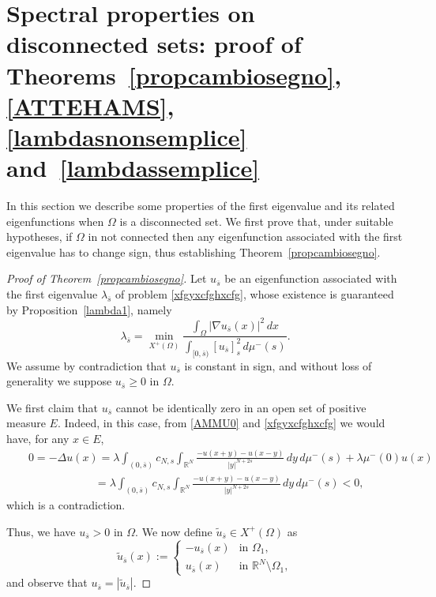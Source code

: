\documentclass[12pt,a4paper,intlimits,sumlimits]{amsart}
\def \R {\mathbb{R}}
\theoremstyle{definition}
\theoremstyle{plain}
\numberwithin{equation}{section}
\renewcommand{\geq}{\geqslant}
\begin{document}
\section{Spectral properties on disconnected sets:
proof of Theorems~\ref{propcambiosegno}, \ref{ATTEHAMS},
\ref{lambdasnonsemplice}
and~\ref{lambdassemplice}}\label{sezionedisconnessi}

In this section we describe some properties of the first eigenvalue and its related eigenfunctions when $\Omega$ is a disconnected set.
We first prove that, under suitable hypotheses, if $\Omega$ in not connected then any eigenfunction associated with the first eigenvalue has to change sign,
thus establishing Theorem~\ref{propcambiosegno}.

\begin{proof}[Proof of Theorem~\ref{propcambiosegno}]
Let $u_{\overline s}$ be an eigenfunction associated with the first eigenvalue $\lambda_{\overline s}$ of problem \eqref{xfgyxcfghxcfg}, whose existence is guaranteed by Proposition~\ref{lambda1},
namely
\begin{equation}\label{xfgyxcfghxcfg1}
\lambda_{\overline s}=\min_{X^+(\Omega)} \dfrac{\displaystyle\int_{\Omega}|\nabla u_{\overline s}(x)|^2\,dx}{\displaystyle \int_{[0,\overline s)}[u_{\overline s}]_s^2\,d\mu^-(s)}.
\end{equation}
We assume by contradiction that $u_{\overline s}$ is constant in sign, and without loss of generality we suppose $u_{\overline s}\geq 0$ in $\Omega$. 

We first claim that $u_{\overline s}$ cannot be identically zero in an open set of positive measure $E$. Indeed, in this case, from \eqref{AMMU0} and \eqref{xfgyxcfghxcfg} we would have, for any $x\in E$,
\begin{eqnarray*}&&
0=-\Delta u(x)= \lambda\displaystyle \int_{(0,\overline s)} c_{N,s}\int_{\R^N} \frac{- u(x+y)-u(x-y)}{|y|^{N+2s}}\, dy\,d\mu^-(s)
+\lambda\mu^-(0)u(x)\\&&\qquad\qquad\qquad=\lambda\displaystyle \int_{(0,\overline s)} c_{N,s}\int_{\R^N} \frac{- u(x+y)-u(x-y)}{|y|^{N+2s}}\, dy\,d\mu^-(s)
<0,
\end{eqnarray*}
which is a contradiction.

Thus, we have $u_{\overline s}>0$ in $\Omega$. We now define $\widetilde u_{\overline s}\in X^+(\Omega)$ as
\[
\widetilde u_{\overline s}(x):=
\begin{cases}
-u_{\overline s}(x)   &\mbox{in }\Omega_1,
\\
u_{\overline s}(x)   &\mbox{in }\R^N\setminus \Omega_1,
\end{cases}
\] 
and observe that $u_{\overline s}=|\widetilde u_{\overline s}|$.


\end{proof}
\end{document}
